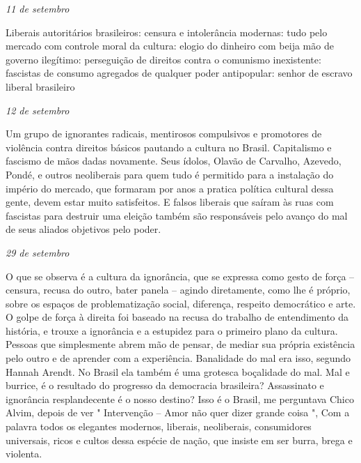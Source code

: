 \begin{flushright}
\emph{11 de setembro}
\end{flushright}

Liberais autoritários brasileiros: censura e intolerância modernas: tudo
pelo mercado com controle moral da cultura: elogio do dinheiro com beija
mão de governo ilegítimo: perseguição de direitos contra o comunismo
inexistente: fascistas de consumo agregados de qualquer poder
antipopular: senhor de escravo liberal brasileiro

\begin{flushright}
\emph{12 de setembro}
\end{flushright}

Um grupo de ignorantes radicais, mentirosos compulsivos e promotores de
violência contra direitos básicos pautando a cultura no Brasil.
Capitalismo e fascismo de mãos dadas novamente. Seus ídolos, Olavão de
Carvalho, Azevedo, Pondé, e outros neoliberais para quem tudo é
permitido para a instalação do império do mercado, que formaram por anos
a pratica política cultural dessa gente, devem estar muito satisfeitos.
E falsos liberais que saíram às ruas com fascistas para destruir uma
eleição também são responsáveis pelo avanço do mal de seus aliados
objetivos pelo poder.

\begin{flushright}
\emph{29 de setembro}
\end{flushright}

O que se observa é a cultura da ignorância, que se expressa como gesto
de força -- censura, recusa do outro, bater panela -- agindo diretamente,
como lhe é próprio, sobre os espaços de problematização social,
diferença, respeito democrático e arte. O golpe de força à direita foi
baseado na recusa do trabalho de entendimento da história, e trouxe a
ignorância e a estupidez para o primeiro plano da cultura. Pessoas que
simplesmente abrem mão de pensar, de mediar sua própria existência pelo
outro e de aprender com a experiência. Banalidade do mal era isso,
segundo Hannah Arendt. No Brasil ela também é uma grotesca boçalidade do
mal. Mal e burrice, é o resultado do progresso da democracia brasileira?
Assassinato e ignorância resplandecente é o nosso destino? Isso é o
Brasil, me perguntava Chico Alvim, depois de ver " Intervenção -- Amor
não quer dizer grande coisa ", Com a palavra todos os elegantes
modernos, liberais, neoliberais, consumidores universais, ricos e cultos
dessa espécie de nação, que insiste em ser burra, brega e violenta.

